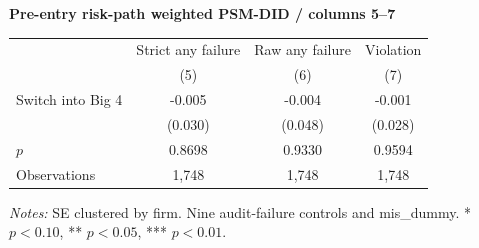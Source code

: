 \documentclass[10pt]{article}
\begin{document}
\medskip\textbf{Pre-entry risk-path weighted PSM-DID / columns 5--7}\par\smallskip
\begin{tabular*}{\textwidth}{@{\extracolsep{\fill}}lccc@{}}
\toprule
 & Strict any failure & Raw any failure & Violation \\
 & (5) & (6) & (7) \\
\midrule
Switch into Big 4 & -0.005 & -0.004 & -0.001 \\
 & (0.030) & (0.048) & (0.028) \\
$p$ & 0.8698 & 0.9330 & 0.9594 \\
Observations & 1,748 & 1,748 & 1,748 \\
\bottomrule\end{tabular*}\par
\medskip\fontsize{9}{11}\selectfont\textit{Notes:} SE clustered by firm. Nine audit-failure controls and mis\_dummy. * $p<0.10$, ** $p<0.05$, *** $p<0.01$.
\end{document}
